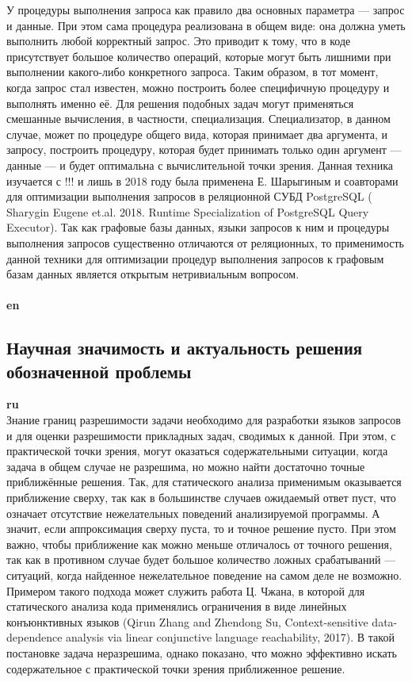 \documentclass[12pt]{article}  %
\theoremstyle{remark}
\begin{document}
У процедуры выполнения запроса как правило два основных параметра --- запрос и данные.
При этом сама процедура реализована в общем виде: она должна уметь выполнить любой корректный запрос.
Это приводит к тому, что в коде присутствует большое количество операций, которые могут быть лишними при выполнении какого-либо конкретного запроса. 
Таким образом, в тот момент, когда запрос стал известен, можно построить более специфичную процедуру и выполнять именно её.
Для решения подобных задач могут применяться смешанные вычисления, в частности, специализация.
Специализатор, в данном случае, может по процедуре общего вида, которая принимает два аргумента, и запросу, построить процедуру, которая будет принимать только один аргумент --- данные --- и будет оптимальна с вычислительной точки зрения. Данная техника изучается с !!! и лишь в 2018 году была применена Е. Шарыгиным и соавторами для оптимизации выполнения запросов в реляционной СУБД PostgreSQL ( Sharygin Eugene et.al. 2018. Runtime Specialization of PostgreSQL Query Executor). Так как графовые базы данных, языки запросов к ним и процедуры выполнения запросов существенно отличаются от реляционных, то применимость данной техники для оптимизации процедур выполнения запросов к графовым базам данных является открытым нетривиальным вопросом.
\\
\\
\textbf{en}\\

\subsection{Научная значимость и актуальность решения обозначенной проблемы}

\textbf{ru}\\
%
Знание границ разрешимости задачи необходимо для разработки языков запросов и для оценки разрешимости прикладных задач, сводимых к данной.
При этом, с практической точки зрения, могут оказаться содержательными ситуации, когда задача в общем случае не разрешима, но можно найти достаточно точные приближённые решения.
Так, для статического анализа применимым  оказывается приближение сверху, так как в большинстве случаев ожидаемый ответ пуст, что означает отсутствие нежелательных поведений анализируемой программы. 
А значит, если аппроксимация сверху пуста, то и точное решение пусто.
При этом важно, чтобы приближение как можно меньше отличалось от точного решения, так как в противном случае будет большое количество ложных срабатываний --- ситуаций, когда найденное нежелательное поведение на самом деле не возможно.
Примером такого подхода может служить работа Ц. Чжана, в которой для статического анализа кода применялись ограничения в виде линейных конъюнктивных языков (Qirun Zhang and Zhendong Su, Context-sensitive data-dependence analysis via linear conjunctive language reachability, 2017). В такой постановке задача неразрешима, однако показано, что можно эффективно искать содержательное с практической точки зрения приближенное решение.
\end{document}
